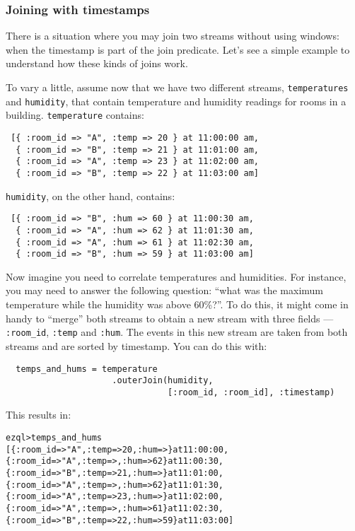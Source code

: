 \documentclass{report}
\newenvironment{evaluation}
{
  \framed
  \begin{alltt}
}
{
  \end{alltt}
  \endframed
}
\begin{document}
\subsubsection{Joining with timestamps}
\label{sec:timestamp-join}

There is a situation where you may join two streams without using
windows: when the timestamp is part of the join predicate. Let's see a
simple example to understand how these kinds of joins work.

To vary a little, assume now that we have two different streams,
\verb=temperatures= and \verb=humidity=, that contain temperature and
humidity readings for rooms in a building. \verb=temperature= contains:

\begin{verbatim}
 [{ :room_id => "A", :temp => 20 } at 11:00:00 am,
  { :room_id => "B", :temp => 21 } at 11:01:00 am,
  { :room_id => "A", :temp => 23 } at 11:02:00 am,
  { :room_id => "B", :temp => 22 } at 11:03:00 am]
\end{verbatim}

\verb=humidity=, on the other hand, contains:

\begin{verbatim}
 [{ :room_id => "B", :hum => 60 } at 11:00:30 am,
  { :room_id => "A", :hum => 62 } at 11:01:30 am,
  { :room_id => "A", :hum => 61 } at 11:02:30 am,
  { :room_id => "B", :hum => 59 } at 11:03:00 am]
\end{verbatim}

Now imagine you need to correlate temperatures and humidities. For
instance, you may need to answer the following question: ``what was
the maximum temperature while the humidity was above 60\%?''. To do
this, it might come in handy to ``merge'' both streams to obtain a new
stream with three fields --- \verb=:room_id=, \verb=:temp= and
\verb=:hum=. The events in this new stream are taken from both
streams and are sorted by timestamp. You can do this with:

\begin{verbatim}
  temps_and_hums = temperature
                     .outerJoin(humidity,
                                [:room_id, :room_id], :timestamp)
\end{verbatim}

This results in:

\begin{evaluation}
ezql> temps_and_hums
[\{ :room_id => "A", :temp =>  20, :hum =>     \} at 11:00:00,
 \{ :room_id => "A", :temp =>    , :hum =>  62 \} at 11:00:30,
 \{ :room_id => "B", :temp =>  21, :hum =>     \} at 11:01:00,
 \{ :room_id => "A", :temp =>    , :hum =>  62 \} at 11:01:30,
 \{ :room_id => "A", :temp =>  23, :hum =>     \} at 11:02:00,
 \{ :room_id => "A", :temp =>    , :hum =>  61 \} at 11:02:30,
 \{ :room_id => "B", :temp =>  22, :hum =>  59 \} at 11:03:00]
\end{evaluation}
\end{document}
